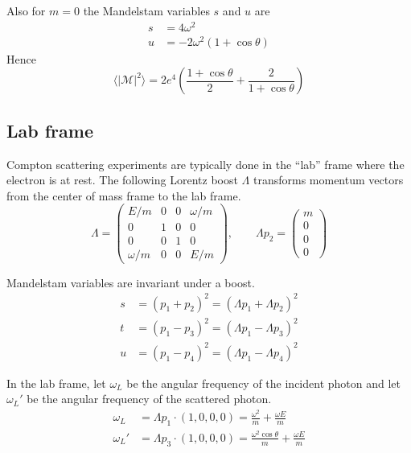 \documentclass[12pt]{article}
\begin{document}
\noindent
Also for $m=0$ the Mandelstam variables $s$ and $u$ are
\begin{align*}
s&=4\omega^2
\\
u&=-2\omega^2(1+\cos\theta)
\end{align*}
Hence
\begin{equation}
\langle|\mathcal{M}|^2\rangle
=2e^4\left(
\frac{1+\cos\theta}{2}+\frac{2}{1+\cos\theta}
\right)
\end{equation}

\subsection*{Lab frame}
Compton scattering experiments are typically done in the ``lab'' frame where the electron is at rest.
The following Lorentz boost $\Lambda$ transforms momentum vectors from
the center of mass frame to the lab frame.
\begin{equation*}
\Lambda=
\begin{pmatrix}
E/m & 0 & 0 & \omega/m\\
0 & 1 & 0 & 0\\
0 & 0 & 1 & 0\\
\omega/m & 0 & 0 & E/m
\end{pmatrix},
\qquad
\Lambda p_2=\begin{pmatrix}m \\ 0 \\ 0 \\ 0\end{pmatrix}
\end{equation*}

\noindent
Mandelstam variables are invariant under a boost.
\begin{equation*}
\begin{aligned}
s&=(p_1+p_2)^2=(\Lambda p_1+\Lambda p_2)^2
\\
t&=(p_1-p_3)^2=(\Lambda p_1-\Lambda p_3)^2
\\
u&=(p_1-p_4)^2=(\Lambda p_1-\Lambda p_4)^2
\end{aligned}
\end{equation*}

\noindent
In the lab frame, let $\omega_L$ be the angular frequency of the incident photon
and let $\omega_L'$ be the angular frequency of the scattered photon.
\begin{equation*}
\begin{aligned}
\omega_L&=\Lambda p_1\cdot(1,0,0,0)=\frac{\omega^2}{m}+\frac{\omega E}{m}
\\
\omega_L'&=\Lambda p_3\cdot(1,0,0,0)=\frac{\omega^2\cos\theta}{m}+\frac{\omega E}{m}
\end{aligned}
\end{equation*}
\end{document}
